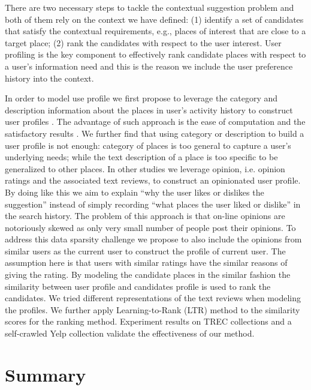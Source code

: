 There are two necessary steps to tackle the contextual suggestion problem 
and both of them rely on the context we have defined: 
(1) identify a set of candidates that satisfy the contextual 
requirements, e.g., places of interest that are close to a target place; 
(2) rank the candidates with respect to the user interest. 
User profiling is the key component to effectively rank candidate places 
with respect to a user's information need and this is the reason we include 
the user preference history into the context. 

In order to model use profile we first propose to leverage the 
category and description information about the places in user's activity 
history to construct user profiles \cite{udel:treccs2012}. 
The advantage of such approach is the ease of computation and the satisfactory 
results \cite{adriel:overview}. 
We further find that using category or description to build a user profile 
is not enough: category of places is too general to capture a user's 
underlying needs; while the text description of a place is too specific to 
be generalized to other places. 
In other studies \cite{udel:treccs2013,udel:treccs2014,udel:treccs2015,Yang:2013:OUP:2499178.2499191,Yang2015}
we leverage opinion, 
i.e. opinion ratings and the associated text reviews, to construct an 
opinionated user profile. By doing like this we aim to explain 
``why the user likes or dislikes the suggestion'' instead of simply recording 
``what places the user liked or dislike'' in the search history. 
The problem of this approach is that on-line opinions are notoriously skewed 
as only very small number of people post their opinions. 
To address this data sparsity challenge we propose to also include the 
opinions from similar users as the current user to construct the profile of 
current user. The assumption here is that users with similar ratings have 
the similar reasons of giving the rating. By modeling the candidate places 
in the similar fashion the similarity between user profile and candidates 
profile is used to rank the candidates. We tried different representations 
of the text reviews when modeling the profiles. We further apply 
Learning-to-Rank (LTR) method to the similarity scores for the ranking method. 
Experiment results on TREC collections and a self-crawled Yelp collection 
validate the effectiveness of our method.


\section{Summary}


